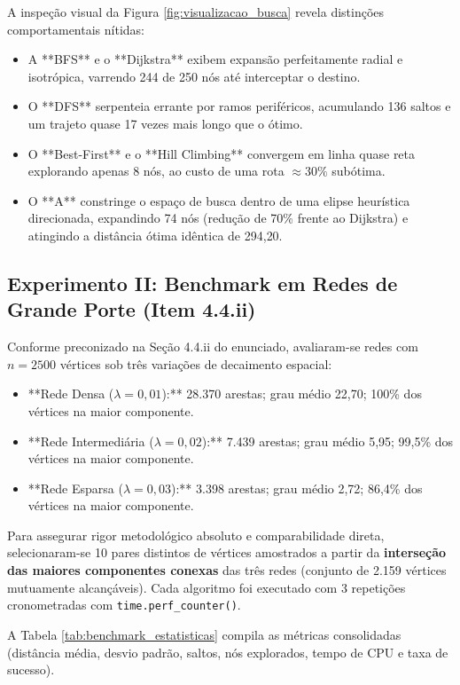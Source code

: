 \documentclass[a4paper,10pt,twocolumn]{article}
\begin{document}
A inspeção visual da Figura \ref{fig:visualizacao_busca} revela distinções comportamentais nítidas:
\begin{itemize}
    \item A **BFS** e o **Dijkstra** exibem expansão perfeitamente radial e isotrópica, varrendo 244 de 250 nós até interceptar o destino.
    \item O **DFS** serpenteia errante por ramos periféricos, acumulando 136 saltos e um trajeto quase 17 vezes mais longo que o ótimo.
    \item O **Best-First** e o **Hill Climbing** convergem em linha quase reta explorando apenas 8 nós, ao custo de uma rota $\approx 30\%$ subótima.
    \item O **A\*** constringe o espaço de busca dentro de uma elipse heurística direcionada, expandindo 74 nós (redução de 70\% frente ao Dijkstra) e atingindo a distância ótima idêntica de 294{,}20.
\end{itemize}

\subsection{Experimento II: Benchmark em Redes de Grande Porte (Item 4.4.ii)}

Conforme preconizado na Seção 4.4.ii do enunciado, avaliaram-se redes com $n = 2500$ vértices sob três variações de decaimento espacial:
\begin{itemize}
    \item **Rede Densa ($\lambda = 0{,}01$):** 28.370 arestas; grau médio 22{,}70; 100\% dos vértices na maior componente.
    \item **Rede Intermediária ($\lambda = 0{,}02$):** 7.439 arestas; grau médio 5{,}95; 99{,}5\% dos vértices na maior componente.
    \item **Rede Esparsa ($\lambda = 0{,}03$):** 3.398 arestas; grau médio 2{,}72; 86{,}4\% dos vértices na maior componente.
\end{itemize}

Para assegurar rigor metodológico absoluto e comparabilidade direta, selecionaram-se 10 pares distintos de vértices amostrados a partir da \textbf{interseção das maiores componentes conexas} das três redes (conjunto de 2.159 vértices mutuamente alcançáveis). Cada algoritmo foi executado com 3 repetições cronometradas com \texttt{time.perf\_counter()}.

A Tabela \ref{tab:benchmark_estatisticas} compila as métricas consolidadas (distância média, desvio padrão, saltos, nós explorados, tempo de CPU e taxa de sucesso).
\end{document}
